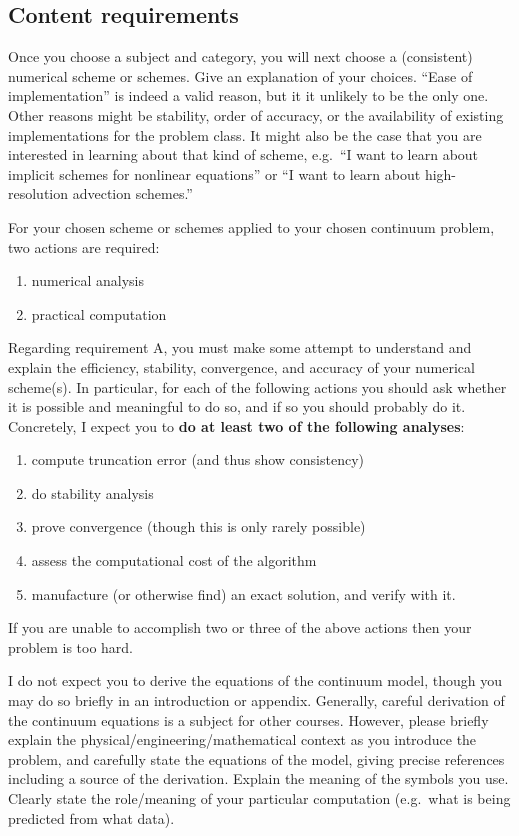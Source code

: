 \documentclass[11pt]{amsart}
\begin{document}
\subsection*{Content requirements}  Once you choose a subject and category, you will next choose a (consistent) numerical scheme or schemes.  Give an explanation of your choices.  ``Ease of implementation'' is indeed a valid reason, but it it unlikely to be the only one.  Other reasons might be stability, order of accuracy, or the availability of existing implementations for the problem class.  It might also be the case that you are interested in learning about that kind of scheme, e.g.~``I want to learn about implicit schemes for nonlinear equations'' or ``I want to learn about high-resolution advection schemes.''

For your chosen scheme or schemes applied to your chosen continuum problem, two actions are required:
\renewcommand{\labelenumi}{\Alph{enumi}.}
\begin{enumerate}
\item numerical analysis
\item practical computation
\end{enumerate}

Regarding requirement A, you must make some attempt to understand and explain the efficiency, stability, convergence, and accuracy of your numerical scheme(s).  In particular, for each of the following actions you should ask whether it is possible and meaningful to do so, and if so you should probably do it.  Concretely, I expect you to \textbf{do at least two of the following analyses}:
\renewcommand{\labelenumi}{\roman{enumi}.}
\begin{enumerate}
\item compute truncation error (and thus show consistency)
\item do stability analysis
\item prove convergence (though this is only rarely possible)
\item assess the computational cost of the algorithm
\item manufacture (or otherwise find) an exact solution, and verify with it.
\end{enumerate}
If you are unable to accomplish two or three of the above actions then your problem is too hard.

I do not expect you to derive the equations of the continuum model, though you may do so briefly in an introduction or appendix.  Generally, careful derivation of the continuum equations is a subject for other courses.  However, please briefly explain the physical/engineering/mathematical context as you introduce the problem, and carefully state the equations of the model, giving precise references including a source of the derivation.  Explain the meaning of the symbols you use.  Clearly state the role/meaning of your particular computation (e.g.~what is being predicted from what data).
\end{document}

